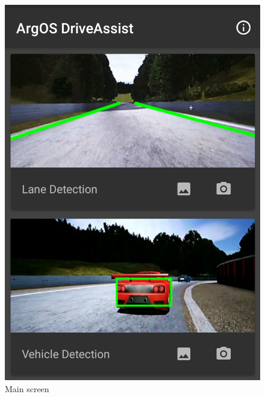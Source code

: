 \begin{figure}[H]
	\includegraphics[width=\linewidth]{images/screenshot_main.png}
	\caption{Main screen}\label{fig:main_screen}
	\endminipage\hfill

\end{figure}
